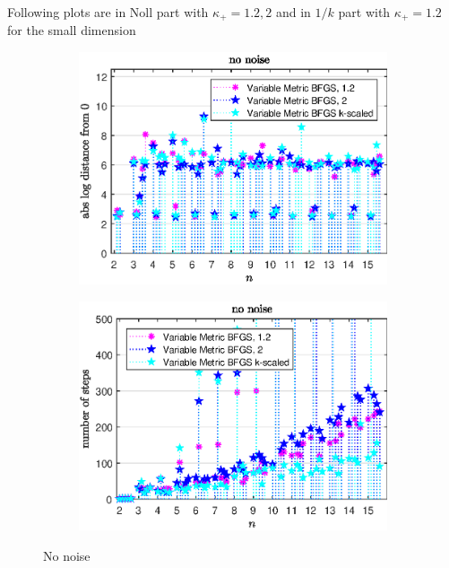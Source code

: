 Following plots are in Noll part with \(\kappa_+ = 1.2, 2\) and in \(1/k\) part with \(\kappa_+ = 1.2\) for the small dimension
\begin{figure}[H]%
	\begin{subfigure}{0.49\textwidth}
		\includegraphics[width=\textwidth]{Pictures/Plots/no_noise_comp.eps}%
	\end{subfigure}
	\begin{subfigure}{0.49\textwidth}
		\includegraphics[width=\textwidth]{Pictures/Plots/steps_no_noise_comp.eps}%
	\end{subfigure}
	\label{fig_no_noise_comp}
	\caption{No noise}
\end{figure}

